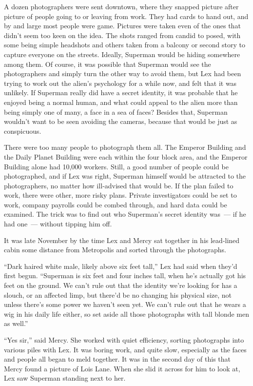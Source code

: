 \documentclass[ebook,12pt]{memoir}
\begin{document}
A dozen photographers were sent downtown, where they snapped picture
after picture of people going to or leaving from work. They had cards to
hand out, and by and large most people were game. Pictures were taken
even of the ones that didn't seem too keen on the idea. The shots ranged
from candid to posed, with some being simple headshots and others taken
from a balcony or second story to capture everyone on the streets.
Ideally, Superman would be hiding somewhere among them. Of course, it
was possible that Superman would see the photographers and simply turn
the other way to avoid them, but Lex had been trying to work out the
alien's psychology for a while now, and felt that it was unlikely. If
Superman really did have a secret identity, it was probable that he
enjoyed being a normal human, and what could appeal to the alien more
than being simply one of many, a face in a sea of faces? Besides that,
Superman wouldn't want to be seen avoiding the cameras, because that
would be just as conspicuous.

There were too many people to photograph them all. The Emperor Building
and the Daily Planet Building were each within the four block area, and
the Emperor Building alone had 10,000 workers. Still, a good number of
people could be photographed, and if Lex was right, Superman himself
would be attracted to the photographers, no matter how ill‐advised that
would be. If the plan failed to work, there were other, more risky
plans. Private investigators could be set to work, company payrolls
could be combed through, and hard data could be examined. The trick was
to find out who Superman's secret identity was~--- if he had one~---
without tipping him off.

It was late November by the time Lex and Mercy sat together in his
lead‐lined cabin some distance from Metropolis and sorted through the
photographs.

``Dark haired white male, likely above six feet tall,'' Lex had said
when they'd first begun. ``Superman is six feet and four inches tall,
when he's actually got his feet on the ground. We can't rule out that
the identity we're looking for has a slouch, or an affected limp, but
there'd be no changing his physical size, not unless there's some power
we haven't seen yet. We can't rule out that he wears a wig in his daily
life either, so set aside all those photographs with tall blonde men as
well.''

``Yes sir,'' said Mercy. She worked with quiet efficiency, sorting
photographs into various piles with Lex. It was boring work, and quite
slow, especially as the faces and people all began to meld together. It
was in the second day of this that Mercy found a picture of Lois Lane.
When she slid it across for him to look at, Lex saw Superman standing
next to her.
\end{document}
